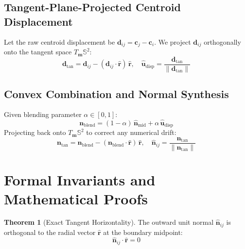 \documentclass[11pt,a4paper]{article}
\theoremstyle{definition}
\newtheorem{theorem}{Theorem}
\begin{document}
\subsection{Tangent-Plane-Projected Centroid Displacement}
Let the raw centroid displacement be $\mathbf{d}_{ij} = \mathbf{c}_j - \mathbf{c}_i$. We project $\mathbf{d}_{ij}$ orthogonally onto the tangent space $T_{\mathbf{m}}\mathbb{S}^2$:
\begin{equation}
    \mathbf{d}_{\text{tan}} = \mathbf{d}_{ij} - (\mathbf{d}_{ij} \cdot \hat{\mathbf{r}})\,\hat{\mathbf{r}}, \quad \hat{\mathbf{u}}_{\text{disp}} = \frac{\mathbf{d}_{\text{tan}}}{\|\mathbf{d}_{\text{tan}}\|}
\end{equation}

\subsection{Convex Combination and Normal Synthesis}
Given blending parameter $\alpha \in [0, 1]$:
\begin{equation}
    \mathbf{n}_{\text{blend}} = (1 - \alpha)\,\hat{\mathbf{n}}_{\text{mid}} + \alpha\,\hat{\mathbf{u}}_{\text{disp}}
\end{equation}
Projecting back onto $T_{\mathbf{m}}\mathbb{S}^2$ to correct any numerical drift:
\begin{equation}
    \mathbf{n}_{\text{tan}} = \mathbf{n}_{\text{blend}} - (\mathbf{n}_{\text{blend}} \cdot \hat{\mathbf{r}})\,\hat{\mathbf{r}}, \quad \hat{\mathbf{n}}_{ij} = \frac{\mathbf{n}_{\text{tan}}}{\|\mathbf{n}_{\text{tan}}\|}
\end{equation}

\section{Formal Invariants and Mathematical Proofs}

\begin{theorem}[Exact Tangent Horizontality]
The outward unit normal $\hat{\mathbf{n}}_{ij}$ is orthogonal to the radial vector $\hat{\mathbf{r}}$ at the boundary midpoint:
\begin{equation}
    \hat{\mathbf{n}}_{ij} \cdot \hat{\mathbf{r}} = 0
\end{equation}
\end{theorem}
\end{document}
